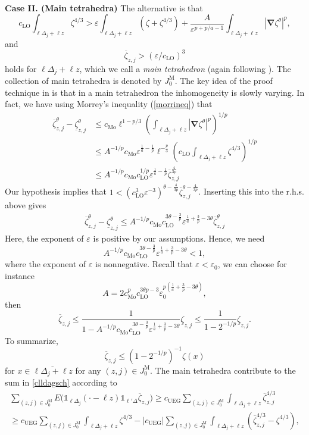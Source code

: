 \documentclass[final,onefignum,onetabnum,reqno]{amsart}
\theoremstyle{remark}
\renewcommand{\le}{\leqslant}
\renewcommand{\ge}{\geqslant}
\renewcommand{\epsilon}{\varepsilon}
\newcommand{\ol}[1]{\overline{#1}}
\newcommand{\ul}[1]{\underline{#1}}
\newcommand{\LO}{\mathrm{LO}} %
\newcommand{\UEG}{\mathrm{UEG}} %
\newcommand{\Mo}{\mathrm{Mo}} %
\newcommand{\iden}{\mathbb{1}} %
\newcommand{\grad}{\bm{\nabla}} %
\newcommand{\tetra}{\mathbb{\Delta}} %
\begin{document}
\vspace{.3em}\\
\noindent\textbf{Case II. (Main tetrahedra)} The alternative is that
$$
c_\LO \int_{\ell\tetra_j+\ell z}\zeta^{4/3}> \epsilon \int_{\ell\tetra_j+\ell z}\left(\zeta +\zeta^{4/3}\right) + \frac{A}{\epsilon^{p+p/a-1}} \int_{\ell\tetra_j+\ell z}|\grad\zeta^\theta|^p,
$$
and 
$$
\ol{\zeta}_{z,j}>(\epsilon/c_\LO)^3
$$
holds for $\ell\tetra_j+\ell z$, which we call a \emph{main tetrahedron} (again following \cite{jex2025classical}). The collection of main tetrahedra is denoted by $J_0^{\mathrm{M}}$.
The key idea of the proof technique in \cite{lewin2020local,jex2025classical} is that in a main tetrahedron the inhomogeneity 
is slowly varying. In fact, we have using Morrey's inequality (\cref{morrineq}) that
\begin{align*}
\ol{\zeta}_{z,j}^\theta-\ul{\zeta}_{z,j}^\theta&\le c_\Mo
\ell^{1-p/3}\left(\int_{\ell\tetra_j+\ell z}|\grad\zeta^\theta|^p\right)^{1/p}\\
&\le A^{-1/p} c_\Mo \epsilon^{\frac{1}{a}-\frac{1}{p}}\ell^{-\frac{p}{3}} \left(c_\LO\int_{\ell\tetra_j+\ell z}\zeta^{4/3}\right)^{1/p}\\
&\le A^{-1/p} c_\Mo c_\LO^{1/p} \epsilon^{\frac{1}{a}-\frac{1}{p}} \ol{\zeta}_{z,j}^{\frac{4}{3p}}
\end{align*}
Our hypothesis implies that $1<(c_\LO^3\epsilon^{-3})^{\theta-\frac{4}{3p}} \ol{\zeta}_{z,j}^{\theta-\frac{4}{3p}}$. Inserting this into the r.h.s. above gives
\begin{align*}
\ol{\zeta}_{z,j}^\theta-\ul{\zeta}_{z,j}^\theta\le A^{-1/p} c_\Mo c_\LO^{3\theta-\frac{3}{p}}  \epsilon^{\frac{1}{a}+\frac{3}{p}-3\theta} \ol{\zeta}_{z,j}^{\theta}
\end{align*}
Here, the exponent of $\epsilon$ is positive by our assumptions. 
Hence, we need
$$
A^{-1/p} c_\Mo c_\LO^{3\theta-\frac{3}{p}} \epsilon^{\frac{1}{a}+\frac{3}{p}-3\theta}<1,
$$
where the exponent of $\epsilon$ is nonnegative. Recall that $\epsilon<\epsilon_0$, we can choose for instance
$$
A=2 c_\Mo^p c_\LO^{3\theta p-3} \epsilon_0^{p(\frac{1}{a}+\frac{3}{p}-3\theta)},
$$
then 
$$
\ol{\zeta}_{z,j}\le \frac{1}{1-A^{-1/p} c_\Mo c_\LO^{3\theta-\frac{3}{p}} \epsilon^{\frac{1}{a}+\frac{3}{p}-3\theta}} \ul{\zeta}_{z,j}\le \frac{1}{1-2^{-1/p}}\ul{\zeta}_{z,j}.
$$
To summarize, 
$$
\ol{\zeta}_{z,j}\le (1-2^{-1/p})^{-1}\zeta(x)
$$
for $x\in \ol{\ell\tetra_j + \ell z}$ for any $(z,j)\in J_0^{\mathrm{M}}$.
The main tetrahedra contribute to the sum in \cref{clldagsch} according to
\begin{multline*}
\sum_{(z,j)\in J_0^{\mathrm{M}}} E\bigl(\iden_{\ell\tetra_j}(\cdot-\ell z)\iden_{\ell'\tetra}\ol{\zeta}_{z,j}\bigr) \ge c_\UEG \sum_{(z,j)\in J_0^{\mathrm{M}}} \int_{\ell\tetra_j+\ell z}\ol{\zeta}_{z,j}^{4/3} \\
\ge c_\UEG \sum_{(z,j)\in J_0^{\mathrm{M}}} \int_{\ell\tetra_j+\ell z}\zeta^{4/3} -
|c_\UEG| \sum_{(z,j)\in J_0^{\mathrm{M}}} \int_{\ell\tetra_j+\ell z} \left(\ol{\zeta}_{z,j}^{4/3}-\zeta^{4/3}\right),
\end{multline*}
\end{document}
